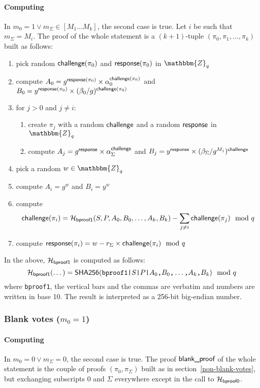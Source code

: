 \documentclass[a4paper]{article}
\newcommand{\Z}{\mathbbm{Z}}
\newcommand{\shatwo}{\textsf{SHA256}}
\begin{document}
\paragraph{Computing \oproof}
In $m_0=1\lor m_\Sigma\in[M_1\dots M_k]$, the second case
is true. Let $i$ be such that $m_\Sigma=M_i$. The proof of the whole
statement is a $(k+1)$-tuple $(\pi_0,\pi_1,\dotsc,\pi_k)$ built as
follows:
\begin{enumerate}
\item pick random $\textsf{challenge}(\pi_0)$ and $\textsf{response}(\pi_0)$
  in $\Z_q$
\item compute
  $A_0=g^{\textsf{response}(\pi_0)}\times\alpha_0^{\textsf{challenge}(\pi_0)}$
  and
  $B_0=y^{\textsf{response}(\pi_0)}\times(\beta_0/g)^{\textsf{challenge}(\pi_0)}$
\item for $j>0$ and $j\neq i$:
  \begin{enumerate}
  \item create $\pi_j$ with a random $\textsf{challenge}$ and a random
    $\textsf{response}$ in $\Z_q$
  \item compute
    $A_j={g^{\textsf{response}}}\times{\alpha_\Sigma^{\textsf{challenge}}}$ and
    $B_j={y^{\textsf{response}}}\times{(\beta_\Sigma/g^{M_j})^{\textsf{challenge}}}$
  \end{enumerate}
\item pick a random $w\in\Z_q$
\item compute $A_i=g^w$ and $B_i=y^w$
\item compute
  \[\textsf{challenge}(\pi_i)=\mathcal{H}_{\textsf{bproof1}}(S,P,A_0,B_0,\dots,A_k,B_k)-\sum_{j\neq i}\textsf{challenge}(\pi_j)\mod q\]
\item compute $\textsf{response}(\pi_i)=w-r_\Sigma\times\textsf{challenge}(\pi_i)\mod q$
\end{enumerate}
In the above, $\mathcal{H}_{\mathsf{bproof1}}$ is computed as follows:
\[\Hash_{\mathsf{bproof1}}(\dotsc)=
\shatwo(\verb=bproof1|=S\verb=|=P\verb=|=A_0\verb=,=B_0\verb=,=\dotsc\verb=,=A_k\verb=,=B_k)\mod q\]
where \verb=bproof1=, the vertical bars and the commas are verbatim and
numbers are written in base 10. The result is interpreted as a 256-bit
big-endian number.

\subsubsection{Blank votes ($m_0=1$)}

\paragraph{Computing \bproof}
In $m_0=0\lor m_\Sigma=0$, the second case is true. The proof
$\textsf{blank\_proof}$ of the whole statement is the couple of proofs
$(\pi_0,\pi_\Sigma)$ built as in section~\ref{non-blank-votes}, but
exchanging subscripts $0$ and $\Sigma$ everywhere except in the call
to $\mathcal{H}_{\textsf{bproof0}}$.
\end{document}
